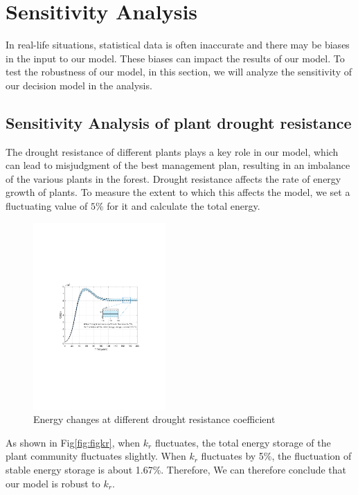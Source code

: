 \documentclass[12pt]{article}  %
\begin{document}
\vspace{-1cm}
\section{Sensitivity Analysis}
\vspace{-0.5cm}
In real-life situations, statistical data is often inaccurate and there may be biases in the input to our model. These biases can impact the results of our model. To test the robustness of our model, in this section, we will analyze the sensitivity of our decision model in the analysis.

\vspace{-0.5cm}
\subsection{Sensitivity Analysis of plant drought resistance}

\vspace{-0.3cm}

The drought resistance of different plants plays a key role in our model, which can lead to misjudgment of the best management plan, resulting in an imbalance of the various plants in the forest. Drought resistance affects the rate of energy growth of plants. To measure the extent to which this affects the model, we set a fluctuating value of $5\%$ for it and calculate the total energy.

\begin{figure}[htbp]
	\centering
	\includegraphics[width=0.45\textwidth]{easymcm/img/sens.pdf}
	\caption{Energy changes at different drought resistance coefficient}
 \label{fig:figkr}
\end{figure}

As shown in Fig\eqref{fig:figkr}, when $k_r$ fluctuates, the total energy storage of the plant community fluctuates slightly. When $k_r$ fluctuates by 5\%, the fluctuation of stable energy storage is about 1.67\%. Therefore, We can therefore conclude that our model is robust to $k_r$.
\end{document}
